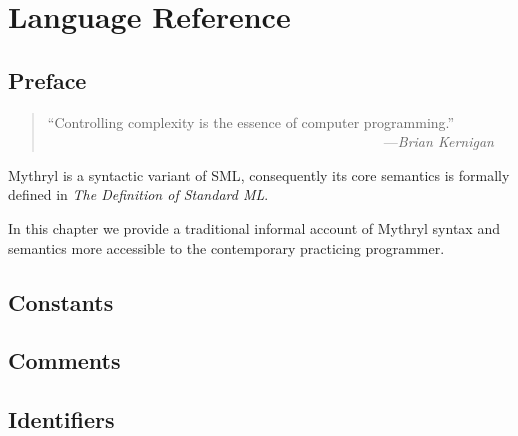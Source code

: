 \chapter{Language Reference}

%
%

\section{Preface}

\begin{quote}\begin{tiny}
               ``Controlling complexity is the essence of computer programming.''\newline
               ~~~~~~~~~~~~~~~~~~~~~~~~~~~~~~~~~~~~~~~~~~~~~~~~---{\em Brian Kernigan}
\end{tiny}\end{quote}

Mythryl is a syntactic variant of {\sc SML}, consequently its core semantics 
is formally defined in {\it The Definition of Standard ML}.

In this chapter we provide a traditional informal account of Mythryl syntax and semantics 
more accessible to the contemporary practicing programmer.


\section{Constants}

\cutend*



\section{Comments}

\cutend*

\section{Identifiers}

\cutend*


